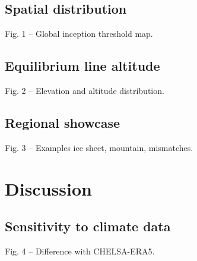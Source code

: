 \documentclass[manuscript]{copernicus}
\begin{document}
\subsection{Spatial distribution}

    Fig. 1 -- Global inception threshold map.


\subsection{Equilibrium line altitude}

    Fig. 2 -- Elevation and altitude distribution.

\subsection{Regional showcase}

    Fig. 3 -- Examples ice sheet, mountain, mismatches.

\section{Discussion}

\subsection{Sensitivity to climate data}

    Fig. 4 -- Difference with CHELSA-ERA5.
\end{document}
